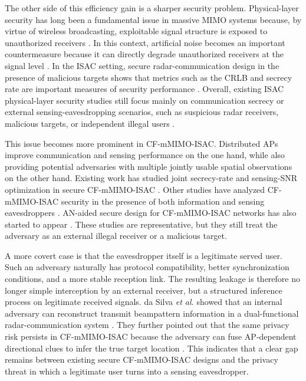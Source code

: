\documentclass[conference,twocolumn,a4paper]{IEEEtran}
\begin{document}
The other side of this efficiency gain is a sharper security problem. Physical-layer security has long been a fundamental issue in massive MIMO systems because, by virtue of wireless broadcasting, exploitable signal structure is exposed to unauthorized receivers \cite{kapetanovic2015physical}. In this context, artificial noise becomes an important countermeasure because it can directly degrade unauthorized receivers at the signal level \cite{goel2008guaranteeing}. In the ISAC setting, secure radar-communication design in the presence of malicious targets shows that metrics such as the CRLB and secrecy rate are important measures of security performance \cite{art:su2021}. Overall, existing ISAC physical-layer security studies still focus mainly on communication secrecy or external sensing-eavesdropping scenarios, such as suspicious radar receivers, malicious targets, or independent illegal users \cite{chalise2018performance,ren2023robust,zou2024securing}.

This issue becomes more prominent in CF-mMIMO-ISAC. Distributed APs improve communication and sensing performance on the one hand, while also providing potential adversaries with multiple jointly usable spatial observations on the other hand. Existing work has studied joint secrecy-rate and sensing-SNR optimization in secure CF-mMIMO-ISAC \cite{nasir2024joint}. Other studies have analyzed CF-mMIMO-ISAC security in the presence of both information and sensing eavesdroppers \cite{ren2023securecf}. AN-aided secure design for CF-mMIMO-ISAC networks has also started to appear \cite{rivetti2024secure}. These studies are representative, but they still treat the adversary as an external illegal receiver or a malicious target.

A more covert case is that the eavesdropper itself is a legitimate served user. Such an adversary naturally has protocol compatibility, better synchronization conditions, and a more stable reception link. The resulting leakage is therefore no longer simple interception by an external receiver, but a structured inference process on legitimate received signals. da Silva \textit{et al.} showed that an internal adversary can reconstruct transmit beampattern information in a dual-functional radar-communication system \cite{dasilva2023privacy}. They further pointed out that the same privacy risk persists in CF-mMIMO-ISAC because the adversary can fuse AP-dependent directional clues to infer the true target location \cite{dasilva2023multistaticcf}. This indicates that a clear gap remains between existing secure CF-mMIMO-ISAC designs and the privacy threat in which a legitimate user turns into a sensing eavesdropper.
\end{document}
